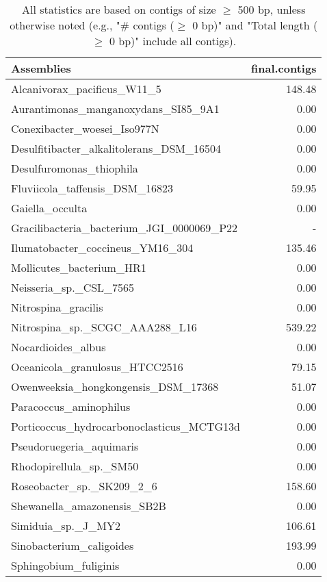 \documentclass[12pt,a4paper]{article}
\begin{document}
\begin{table}[ht]
\begin{center}
\caption{All statistics are based on contigs of size $\geq$ 500 bp, unless otherwise noted (e.g., "\# contigs ($\geq$ 0 bp)" and "Total length ($\geq$ 0 bp)" include all contigs).}
\begin{tabular}{|l*{1}{|r}|}
\hline
Assemblies & final.contigs \\ \hline
Alcanivorax\_pacificus\_W11\_5 & 148.48 \\ \hline
Aurantimonas\_manganoxydans\_SI85\_9A1 & 0.00 \\ \hline
Conexibacter\_woesei\_Iso977N & 0.00 \\ \hline
Desulfitibacter\_alkalitolerans\_DSM\_16504 & 0.00 \\ \hline
Desulfuromonas\_thiophila & 0.00 \\ \hline
Fluviicola\_taffensis\_DSM\_16823 & 59.95 \\ \hline
Gaiella\_occulta & 0.00 \\ \hline
Gracilibacteria\_bacterium\_JGI\_0000069\_P22 & - \\ \hline
Ilumatobacter\_coccineus\_YM16\_304 & 135.46 \\ \hline
Mollicutes\_bacterium\_HR1 & 0.00 \\ \hline
Neisseria\_sp.\_CSL\_7565 & 0.00 \\ \hline
Nitrospina\_gracilis & 0.00 \\ \hline
Nitrospina\_sp.\_SCGC\_AAA288\_L16 & 539.22 \\ \hline
Nocardioides\_albus & 0.00 \\ \hline
Oceanicola\_granulosus\_HTCC2516 & 79.15 \\ \hline
Owenweeksia\_hongkongensis\_DSM\_17368 & 51.07 \\ \hline
Paracoccus\_aminophilus & 0.00 \\ \hline
Porticoccus\_hydrocarbonoclasticus\_MCTG13d & 0.00 \\ \hline
Pseudoruegeria\_aquimaris & 0.00 \\ \hline
Rhodopirellula\_sp.\_SM50 & 0.00 \\ \hline
Roseobacter\_sp.\_SK209\_2\_6 & 158.60 \\ \hline
Shewanella\_amazonensis\_SB2B & 0.00 \\ \hline
Simiduia\_sp.\_J\_MY2 & 106.61 \\ \hline
Sinobacterium\_caligoides & 193.99 \\ \hline
Sphingobium\_fuliginis & 0.00 \\ \hline

\end{tabular}
\end{center}
\end{table}
\end{document}
